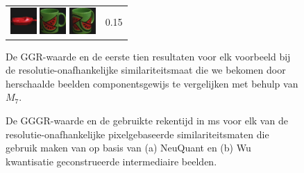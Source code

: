 \begin{figure}[tbp]
\begin{center}
\begin{tabular}{m{11cm} | m{3cm} |}
\includegraphics[width=1cm]{coil/beeld-19.eps}
\includegraphics[width=1cm]{coil/beeld-30.eps}
\includegraphics[width=1cm]{coil/beeld-33.eps}
& {\scriptsize 0.15}
\\
\end{tabular}
\caption{\label{fig:results_beste_scaling}De GGR-waarde en de eerste tien resultaten voor elk voorbeeld bij de resolutie-onafhankelijke similariteitsmaat die we bekomen door herschaalde beelden componentsgewijs te vergelijken met behulp van $M_7$.}
\end{center}
\end{figure}

\begin{figure}[tbp]
\begin{center}
\caption{\label{fig:dom_colors_gggrs_en_cputimes}De GGGR-waarde en de gebruikte rekentijd in ms 
voor elk van de resolutie-onafhankelijke pixelgebaseerde similariteitsmaten die gebruik maken 
van op basis van (a) NeuQuant en (b) Wu kwantisatie geconstrueerde intermediaire beelden.}
\end{center}
\end{figure}

